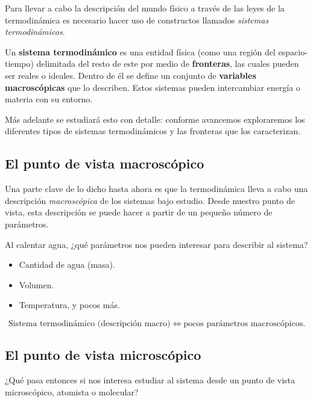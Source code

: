 Para llevar a cabo la descripción del mundo físico a través de las leyes de la termodinámica es
necesario hacer uso de constructos llamados \emph{sistemas termodinámicos}.

\begin{definicion}
  Un \textbf{sistema termodinámico} es una entidad física (como una región del espacio-tiempo)
  delimitada del resto de este por medio de \textbf{fronteras}, las cuales pueden ser reales o
  ideales. Dentro de él se define un conjunto de \textbf{variables macroscópicas} que lo describen.
  Estos sistemas pueden intercambiar energía o materia con su entorno.
\end{definicion}

Más adelante se estudiará esto con detalle: conforme avancemos exploraremos los diferentes tipos
de sistemas termodinámicos y las fronteras que los caracterizan.

\subsection*{El punto de vista macroscópico}

Una parte clave de lo dicho hasta ahora es que la termodinámica lleva a cabo una descripción
\emph{macroscópica} de los sistemas bajo estudio. Desde nuestro punto de vista, esta descripción
se puede hacer a partir de un pequeño número de parámetros.

\begin{ejemplo}
  Al calentar agua, ¿qué parámetros nos pueden interesar para describir al sistema?
  \begin{itemize}[itemsep=0pt]
    \item Cantidad de agua (masa).
    \item Volumen.
    \item Temperatura, y pocos más.
  \end{itemize}
\end{ejemplo}

\begin{equation*}
  \text{Sistema termodinámico (descripción macro)}\;\Longleftrightarrow\;\text{pocos parámetros macroscópicos.}
\end{equation*}

\subsection*{El punto de vista microscópico}

¿Qué pasa entonces si nos interesa estudiar al sistema desde un punto de vista
microscópico, atomista o molecular?

